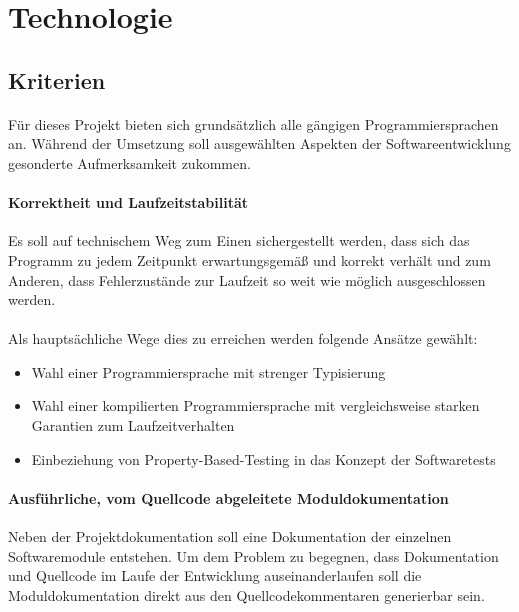 \section{Technologie}
\subsection{Kriterien}
\paragraph{}
Für dieses Projekt bieten sich grundsätzlich alle gängigen Programmiersprachen
an. Während der Umsetzung soll ausgewählten Aspekten der Softwareentwicklung
gesonderte Aufmerksamkeit zukommen.

\paragraph{Korrektheit und Laufzeitstabilität} Es soll auf technischem Weg zum
Einen sichergestellt werden, dass sich das Programm zu jedem Zeitpunkt erwartungsgemäß
und korrekt verhält und zum Anderen, dass Fehlerzustände zur Laufzeit so weit
wie möglich ausgeschlossen werden.

\paragraph{}
Als hauptsächliche Wege dies zu erreichen werden folgende Ansätze gewählt:

\begin{itemize}
    \item Wahl einer Programmiersprache mit strenger Typisierung
    \item Wahl einer kompilierten Programmiersprache mit vergleichsweise starken
          Garantien zum Laufzeitverhalten
    \item Einbeziehung von \gls{Property-Based-Testing} \cite{property-based-testing} in das Konzept der Softwaretests
\end{itemize}

\paragraph{Ausführliche, vom Quellcode abgeleitete Moduldokumentation}
Neben der Projektdokumentation soll eine Dokumentation der einzelnen
Softwaremodule entstehen. Um dem Problem zu begegnen, dass Dokumentation und
Quellcode im Laufe der Entwicklung auseinanderlaufen soll die Moduldokumentation
direkt aus den Quellcodekommentaren generierbar sein.

